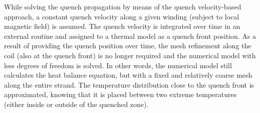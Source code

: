 While solving the quench propagation by means of the quench velocity-based approach, a constant quench velocity along a given winding (subject to local magnetic field) is assumed. The quench velocity is integrated over time in an external routine and assigned to a thermal model as a quench front position. As a result of providing the quench position over time, the mesh refinement along the coil (also at the quench front) is no longer required and the numerical model with less degrees of freedom is solved. In other words, the numerical model still calculates the heat balance equation, but with a fixed and relatively coarse mesh along the entire strand. The temperature distribution close to the quench front is approximated, knowing that it is placed between two extreme temperatures (either inside or outside of the quenched zone).
